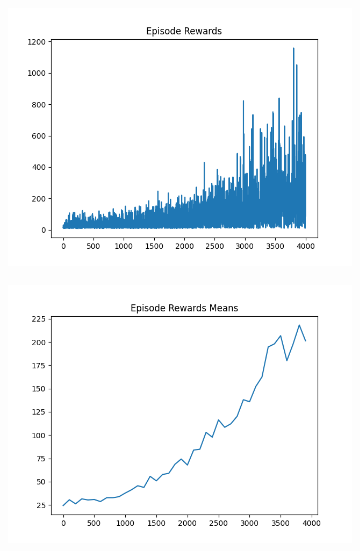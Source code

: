 \begin{figure}[H]
\begin{subfigure}{.47\linewidth}
        \includegraphics[width=\textwidth]{pole/2024-06-13_23-08-40_dqn_cartpole_episode_rewards.png}
    \end{subfigure}
    \begin{subfigure}{.47\linewidth}
        \centering
        \includegraphics[width=\textwidth]{pole/2024-06-13_23-08-40_dqn_cartpole_episode_rewards_means.png}
    \end{subfigure}
\end{figure}
